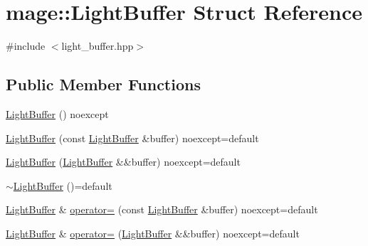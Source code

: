 \hypertarget{structmage_1_1_light_buffer}{}\section{mage\+:\+:Light\+Buffer Struct Reference}
\label{structmage_1_1_light_buffer}


{\ttfamily \#include $<$light\+\_\+buffer.\+hpp$>$}

\subsection*{Public Member Functions}
\begin{DoxyCompactItemize}
\item 
\hyperlink{structmage_1_1_light_buffer_a4febaa8f3e03beb1a150367c137b6975}{Light\+Buffer} () noexcept
\item 
\hyperlink{structmage_1_1_light_buffer_a345064315aec6c07804d5ee218f4176f}{Light\+Buffer} (const \hyperlink{structmage_1_1_light_buffer}{Light\+Buffer} \&buffer) noexcept=default
\item 
\hyperlink{structmage_1_1_light_buffer_aefffd7152e1b54cd069d6e8e1fdcedcd}{Light\+Buffer} (\hyperlink{structmage_1_1_light_buffer}{Light\+Buffer} \&\&buffer) noexcept=default
\item 
\hyperlink{structmage_1_1_light_buffer_a0dc88c8ad1721b4b545c65c26c2fec69}{$\sim$\+Light\+Buffer} ()=default
\item 
\hyperlink{structmage_1_1_light_buffer}{Light\+Buffer} \& \hyperlink{structmage_1_1_light_buffer_ad89633dcca7fc573a3890f79d840ca7f}{operator=} (const \hyperlink{structmage_1_1_light_buffer}{Light\+Buffer} \&buffer) noexcept=default
\item 
\hyperlink{structmage_1_1_light_buffer}{Light\+Buffer} \& \hyperlink{structmage_1_1_light_buffer_ab6b941170192e5ced1885b862cfcc678}{operator=} (\hyperlink{structmage_1_1_light_buffer}{Light\+Buffer} \&\&buffer) noexcept=default
\end{DoxyCompactItemize}
